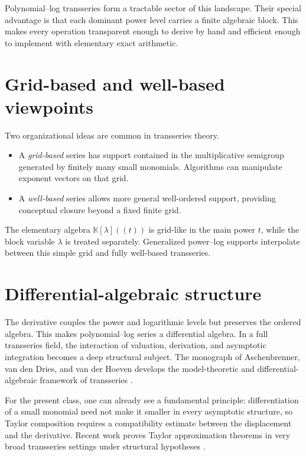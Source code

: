 \documentclass[11pt,openany]{book}
\theoremstyle{definition}
\theoremstyle{plain}
\theoremstyle{remark}
\newcommand{\K}{\mathbb{K}}
\begin{document}
Polynomial--log transseries form a tractable sector of this landscape. Their special advantage is that each dominant power level carries a finite algebraic block. This makes every operation transparent enough to derive by hand and efficient enough to implement with elementary exact arithmetic.


\section{Grid-based and well-based viewpoints}
Two organizational ideas are common in transseries theory.
\begin{itemize}
\item A \emph{grid-based} series has support contained in the multiplicative semigroup generated by finitely many small monomials. Algorithms can manipulate exponent vectors on that grid.
\item A \emph{well-based} series allows more general well-ordered support, providing conceptual closure beyond a fixed finite grid.
\end{itemize}
The elementary algebra \(\K[\lambda]((t))\) is grid-like in the main power \(t\), while the block variable \(\lambda\) is treated separately. Generalized power--log supports interpolate between this simple grid and fully well-based transseries.

\section{Differential-algebraic structure}
The derivative couples the power and logarithmic levels but preserves the ordered algebra. This makes polynomial--log series a differential algebra. In a full transseries field, the interaction of valuation, derivation, and asymptotic integration becomes a deep structural subject. The monograph of Aschenbrenner, van den Dries, and van der Hoeven develops the model-theoretic and differential-algebraic framework of transseries \cite{adh-book}.

For the present class, one can already see a fundamental principle: differentiation of a small monomial need not make it smaller in every asymptotic structure, so Taylor composition requires a compatibility estimate between the displacement and the derivative. Recent work proves Taylor approximation theorems in very broad transseries settings under structural hypotheses \cite{mantova-monotonicity}.
\end{document}
